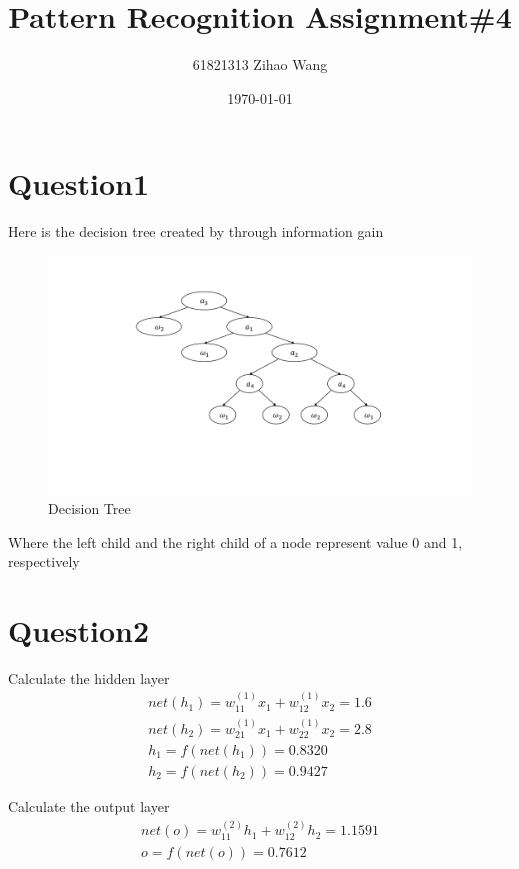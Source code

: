 \documentclass{article}
\title{Pattern Recognition Assignment\#4}
\author{61821313 Zihao Wang}
\date{\today}
\begin{document}
\maketitle

\section*{Question1}

Here is the decision tree created by through information gain

\begin{figure}[htbp]
    \centering
    \includegraphics[width=\textwidth, trim=80 150 30 80, clip]{tree.pdf}
    \caption{Decision Tree}
\end{figure}

Where the left child and the right child of a node represent value 0 and 1, respectively

\section*{Question2}

Calculate the hidden layer
\begin{gather*}
net(h_{1}) = w_{11}^{(1)} x_{1} + w_{12}^{(1)} x_{2} = 1.6 \\[3mm]
net(h_{2}) = w_{21}^{(1)} x_{1} + w_{22}^{(1)} x_{2} = 2.8 \\[3mm]
h_{1} = f(net(h_{1})) = 0.8320 \\[3mm]
h_{2} = f(net(h_{2})) = 0.9427
\end{gather*}

Calculate the output layer
\begin{gather*}
net(o) = w_{11}^{(2)} h_{1} + w_{12}^{(2)} h_{2} = 1.1591 \\[3mm]
o = f(net(o)) = 0.7612
\end{gather*}
\end{document}
